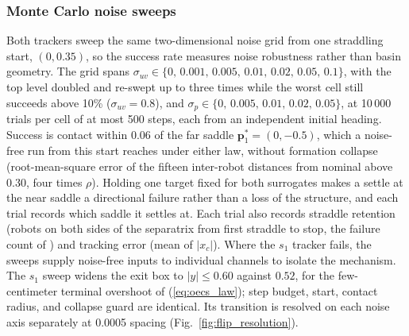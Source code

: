 \documentclass[lettersize,journal]{IEEEtran}
\begin{document}
\subsubsection{Monte Carlo noise sweeps}
Both trackers sweep the same two-dimensional noise grid from one
straddling start, $(0, 0.35)$, so the success rate measures noise
robustness rather than basin geometry. The grid spans $\sigma_{uv} \in
\{0,\, 0.001,\, 0.005,\, 0.01,\, 0.02,\, 0.05,\, 0.1\}$, with the top
level doubled and re-swept up to three times while the worst cell still
succeeds above 10\% ($\sigma_{uv} = 0.8$), and $\sigma_p \in \{0,\,
0.005,\, 0.01,\, 0.02,\, 0.05\}$, at 10\,000 trials per cell of at most
500 steps, each from an independent initial heading. Success is contact
within 0.06 of the far saddle $\mathbf{p}^*_1 = (0, -0.5)$, which a
noise-free run from this start reaches under either law, without
formation collapse (root-mean-square error of the fifteen inter-robot
distances from nominal above 0.30, four times $\rho$). Holding one
target fixed for both surrogates makes a settle at the near saddle a
directional failure rather than a loss of the structure, and each trial
records which saddle it settles at. Each trial also records straddle
retention (robots on both sides of the separatrix from first
straddle to stop, the failure count of \cite{17}) and tracking error (mean of
$|x_c|$). Where the $s_1$ tracker fails, the sweeps supply noise-free
inputs to individual channels to isolate the mechanism. The $s_1$ sweep
widens the exit box to
$|y| \leq 0.60$ against $0.52$, for the few-centimeter terminal
overshoot of (\ref{eq:oecs_law}); step budget, start, contact radius,
and collapse guard are identical. Its transition is resolved on each
noise axis separately at 0.0005 spacing
(Fig.~\ref{fig:flip_resolution}).
\end{document}

